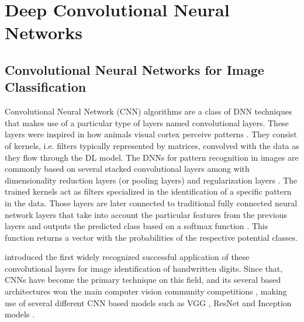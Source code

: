 \documentclass[fleqn,usenatbib]{mnras}
\begin{document}
\section{Deep Convolutional Neural Networks}
\label{sec:deeplearningmodels}
\subsection{Convolutional Neural Networks for Image Classification}
Convolutional Neural Network (CNN) algorithms are a class of DNN techniques that makes use of a particular type of layers named convolutional layers. These layers were inspired in how animals visual cortex perceive patterns \citep{hubel1962receptive,lecun2015deep}. They consist of kernels, i.e. filters typically represented by matrices, convolved with the data as they flow through the DL model. The DNNs for pattern recognition in images are commonly based on several stacked convolutional layers among with dimensionality reduction layers (or pooling layers) and regularization layers \citep[e.g.,  dropouts or batch normalizations, see][]{Goodfellow-et-al-2016, chollet2018deep}. The trained kernels act as filters specialized in the identification of a specific pattern in the data. Those layers are later connected to traditional fully connected neural network layers that take into account the particular features from the previous layers and outputs the predicted class based on a softmax function \citep{Goodfellow-et-al-2016}. This function returns a vector with the probabilities of the respective potential classes.

\citet{lecun1998gradient} introduced the first widely recognized successful application of these convolutional layers for image identification of handwritten digits. Since that, CNNs have become the primary technique on this field, and its several based architectures won the main computer vision community competitions \citep[see, e.g.][]{ILSVRC15, krizhevsky2012imagenet}, making use of several different CNN based models such as VGG \citep{simonyan2014very}, ResNet \citep{he2016deep} and Inception models \citep{szegedy2015going,szegedy2016rethinking}.
\end{document}
